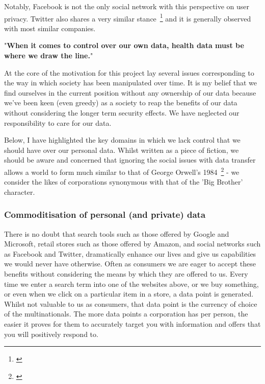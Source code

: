 Notably, Facebook is not the only social network with this perspective on user privacy. Twitter also shares a very similar stance~\footnote{\cite{twittertos:2017:online}} and it is generally observed with most similar companies.

\begin{displayquote}{
  "\textbf{When it comes to control over our own data, health data must be where we draw the line.}"~\cite{wilbankstopol:2016:article}
}\end{displayquote}




At the core of the motivation for this project lay several issues corresponding to the way in which society has been manipulated over time. It is my belief that we find ourselves in the current position without any ownership of our data because we've been keen (even greedy) as a society to reap the benefits of our data without considering the longer term security effects. We have neglected our responsibility to care for our data.

Below, I have highlighted the key domains in which we lack control that we should have over our personal data. Whilst written as a piece of fiction, we should be aware and concerned that ignoring the social issues with data transfer allows a world to form much similar to that of George Orwell's 1984~\footnote{\cite{orwell:1984:book}} - we consider the likes of corporations synonymous with that of the 'Big Brother' character.

\subsubsection{Commoditisation of personal (and private) data}

There is no doubt that search tools such as those offered by Google and Microsoft, retail stores such as those offered by Amazon, and social networks such as Facebook and Twitter, dramatically enhance our lives and give us capabilities we would never have otherwise. Often as consumers we are eager to accept these benefits without considering the means by which they are offered to us. Every time we enter a search term into one of the websites above, or we buy something, or even when we click on a particular item in a store, a data point is generated. Whilst not valuable to us as consumers, that data point is the currency of choice of the multinationals. The more data points a corporation has per person, the easier it proves for them to accurately target you with information and offers that you will positively respond to.

